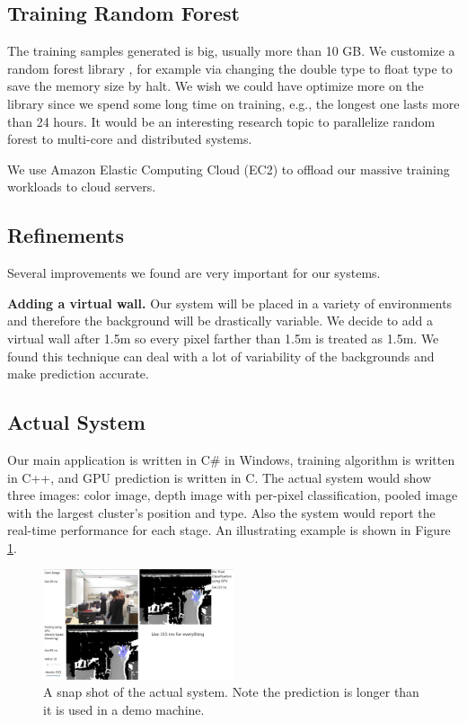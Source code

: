 \subsection{Training Random Forest}

The training samples generated is big, usually more than 10 GB. We customize a random forest library \cite{alglib}, for example via changing the double type to float type to save the memory size by halt. We wish we could have optimize more on the library since we spend some long time on training, e.g., the longest one lasts more than 24 hours. It would be an interesting research topic to parallelize random forest to multi-core and distributed systems.     

We use Amazon Elastic Computing Cloud (EC2) to offload our massive training workloads to cloud servers.  

\subsection{Refinements}

Several improvements we found are very important for our systems.

\textbf{Adding a virtual wall.} Our system will be placed in a variety of environments and therefore the background will be drastically variable. We decide to add a virtual wall after 1.5m so every pixel farther than 1.5m is treated as 1.5m. We found this technique can deal with a lot of variability of the backgrounds and make prediction accurate. 


\subsection{Actual System}

Our main application is written in C\# in Windows, training algorithm is written in C++, and GPU prediction is written in C. The actual system would show three images: color image, depth image with per-pixel classification, pooled image with the largest cluster's position and type. Also the system would report the real-time performance for each stage. An illustrating example is shown in Figure \ref{fig: system}.


\begin{figure}
\centering
	\includegraphics[width=0.5\textwidth]{fig/System.jpg}
	\caption{A snap shot of the actual system. Note the prediction is longer than it is used in a demo machine.}
\label{fig: system}
\end{figure}


